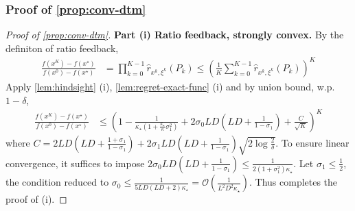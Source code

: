 \documentclass{article}
\theoremstyle{definition}
\begin{document}
\subsubsection{Proof of \cref{prop:conv-dtm}}
\begin{proof}[Proof of \cref{prop:conv-dtm}]
  \textbf{Part (i) Ratio feedback, strongly convex.} By the definiton of ratio feedback,
  \begin{align*}
    \tfrac{f (x^{K}) - f (x^{\star})}{f (x^0) - f (x^{\star})} &{}=
    \textstyle \prod_{k = 0}^{K - 1} \hat{r}_{x^k, \xi^k} (P_k) \leq \left(
    \tfrac{1}{K} \textstyle \sum_{k = 0}^{K - 1} \hat{r}_{x^k, \xi^k} (P_k)
    \right)^K
  \end{align*}
  Apply \cref{lem:hindsight} (i), \cref{lem:regret-exact-func} (i) and by union bound, w.p. $1 - \delta$,
  \begin{align*}
    \tfrac{f (x^{K}) - f (x^{\star})}{f (x^0) - f (x^{\star})} &{}\leq
    \left( 1 - \tfrac{1}{\kappa_{\star} \left( 1 +
    \frac{\kappa_{\star}}{\kappa} \sigma_1^2 \right)} + 2 \sigma_0 L D \left(
    L D + \tfrac{1}{1 - \sigma_1} \right) + \tfrac{C}{\sqrt{K}} \right)^K
  \end{align*}
  where $C = 2 L D \left( L D + \tfrac{1 + \sigma_1}{1 - \sigma_1} \right) + 2
  \sigma_1 L D \left( L D + \tfrac{1}{1 - \sigma_1} \right) \sqrt{2 \log
  \tfrac{2}{\delta}}$. To ensure linear convergence, it suffices to impose $2
  \sigma_0 L D \left( L D + \tfrac{1}{1 - \sigma_1} \right) \leq \tfrac{1}{2
  (1 + \sigma_1^2) \kappa_{\star}}$. Let $\sigma_1 \leq \tfrac{1}{2}$, the
  condition reduced to $\sigma_0 \leq \tfrac{1}{5 L D (L D + 2)
  \kappa_{\star}} = \mathcal{O} \left( \tfrac{1}{L^2 D^2 \kappa_{\star}}
  \right)$. Thus completes the proof of (i).
  

\end{proof}
\end{document}
